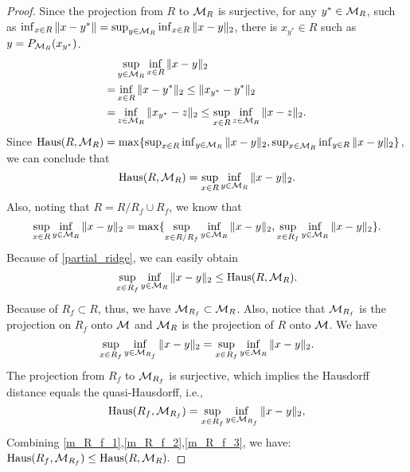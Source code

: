 \documentclass[aos,preprint]{imsart}
\theoremstyle{remark}
\begin{document}
\begin{appendix}
\begin{proof}\label{Transformed Inequality}
Since the projection from $R$ to ${\cal M}_{R}$ is surjective, for any $y^*\in {\cal M}_{R}$, such as
$\inf_{x\in R} \|x-y^*\| = \sup_{y\in {\cal M}_R} \inf_{x\in R}\|x-y\|_2$, there is $x_{y^*}\in R$ such as $y = P_{{\cal M}_R}(x_{y^*})$. 
\[
\begin{aligned}
&\sup_{y\in {\cal M}_R} \inf_{x\in R}\|x-y\|_2 \\
=&\inf_{x\in R} \|x-y^*\|_2 \leq \|x_{y^*} - y^*\|_2 \\
= &\inf_{z\in{\cal M}_R }\|x_{y^*}-z\|_2 \leq \sup_{x\in R}\inf_{z\in{\cal M}_R }\|x-z\|_2.
\end{aligned}
\]
Since ${\rm Haus} (R, {\cal M}_{R}) = \max \{\sup_{x\in R} \inf_{y\in {\cal M}_R} \|x-y\|_2, \sup_{x\in {\cal M}_R} \inf_{y\in R} \|x-y\|_2\}$, we can conclude that
\[
{\rm Haus} (R, {\cal M}_{R}) = \sup_{x\in R} \inf_{y\in {\cal M}_R} \|x-y\|_2.
\]
Also, noting that $R = R/R_f\cup R_f$, we know that
\begin{equation}\label{partial_ridge}
\sup_{x\in R} \inf_{y\in {\cal M}_R} \|x-y\|_2 = \max\{\sup_{x\in R/R_f} \inf_{y\in {\cal M}_R} \|x-y\|_2, \sup_{x\in R_f} \inf_{y\in {\cal M}_R} \|x-y\|_2 \}.
\end{equation}
Because of \eqref{partial_ridge}, we can easily obtain
\begin{equation}\label{m_R_f_1}
\sup_{x\in R_f} \inf_{y\in {\cal M}_R} \|x-y\|_2 \leq {\rm Haus} (R, {\cal M}_{R}).
\end{equation}
Because of $R_f\subset R$, thus, we have ${\cal M}_{R_f}\subset {\cal M}_R$.  Also, notice that ${\cal M}_{R_f}$ is the projection on $R_f$ onto $\cal M$ and ${\cal M}_R$ is the projection of $R$ onto $\cal M$. We have
\begin{equation}\label{m_R_f_2}
\sup_{x\in R_f} \inf_{y\in {\cal M}_{R_f}} \|x-y\|_2=\sup_{x\in R_f} \inf_{y\in {\cal M}_R} \|x-y\|_2.
\end{equation}
The projection from $R_f$ to ${\cal M}_{R_f}$ is surjective, which implies the Hausdorff distance equals the quasi-Hausdorff, \cite{chen2015asymptotic} i.e., 
\begin{equation}\label{m_R_f_3}
{\rm Haus} (R_f, {\cal M}_{R_f}) = \sup_{x\in R_f} \inf_{y\in {\cal M}_{R_f}} \|x-y\|_2,
\end{equation}
Combining \eqref{m_R_f_1},\eqref{m_R_f_2},\eqref{m_R_f_3}, we have:
$
{\rm Haus} (R_f, {\cal M}_{R_f}) \leq {\rm Haus} (R, {\cal M}_{R}).
$
\end{proof}

\end{appendix}



%


\end{document}
